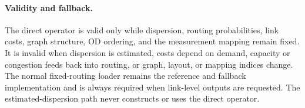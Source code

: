 \paragraph{Validity and fallback.}
The direct operator is valid only while dispersion, routing probabilities,
link costs, graph structure, OD ordering, and the measurement mapping remain
fixed.  It is invalid when dispersion is estimated, costs depend on demand,
capacity or congestion feeds back into routing, or graph, layout, or mapping
indices change.  The normal fixed-routing loader remains the reference and
fallback implementation and is always required when link-level outputs are
requested.  The estimated-dispersion path never constructs or uses the direct
operator.

